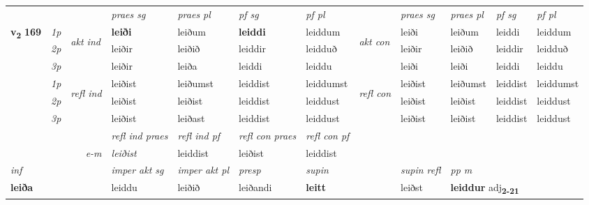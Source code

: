 \begin{longtable}[l]{X>{\footnotesize\itshape}llXXXXlXXXX}
\midrule

 & &   & \textit{praes sg}  & \textit{praes pl}    & \textit{ pf sg} & \textit{pf pl} & & \textit{praes sg}  & \textit{praes pl}    & \textit{pf sg} & \textit{pf pl }  \\ \cmidrule{4-7} \cmidrule{9-12}
 \multirow{2}{*}{{{\textbf{v{\textsubscript{2}}} \Large{\textbf{169}}}}}  & 1p & \multirow{3}{*}{\begin{turn}{90}\textit{akt ind}\end{turn}} & \textbf{leiði} & leiðum & \textbf{leiddi} & leiddum & \multirow{3}{*}{\begin{turn}{90}\textit{akt con}\end{turn}} &leiði & leiðum & leiddi & leiddum\\*
 & 2p &  &  leiðir  & leiðið & leiddir & leidduð & & leiðir & leiðið & leiddir & leidduð \\*
 & 3p &  & leiðir & leiða & leiddi & leiddu & & leiði & leiði& leiddi & leiddu \\*
\cmidrule{4-7} \cmidrule{9-12}
 & 1p & \multirow{3}{*}{\begin{turn}{90}\textit{refl ind}\end{turn}}  & leiðist & leiðumst & leiddist & leiddumst & \multirow{3}{*}{\begin{turn}{90}\textit{refl con}\end{turn}}  &leiðist & leiðumst & leiddist & leiddumst \\*
 & 2p &  & leiðist & leiðist & leiddist & leiddust & &leiðist & leiðist & leiddist & leiddust \\*
 & 3p  & & leiðist & leiðast & leiddist & leiddust & & leiðist & leiðist& leiddist & leiddust \\*
\cmidrule{4-7} \cmidrule{9-12}

 & && \textit{refl ind praes} & \textit{refl ind pf} & \textit{refl con praes} & \textit{refl con pf} \\*
\multicolumn{3}{r}{\textit{e-m}}& leiðist & leiddist & leiðist & leiddist \\*

\cmidrule{4-7}
   {\textit{inf}} & &  & \textit{imper akt sg} & \textit{imper akt pl}   & \textit{presp} & \textit{supin} && \textit{supin refl} & \textit{pp m} \\*
  {\textbf{leiða}} & && leiddu  & leiðið   & leiðandi &  \textbf{leitt} && leiðst & \multicolumn{2}{l}{\textbf{leiddur} adj\textbf{\textsubscript{2-21}}} \\*

\midrule


\end{longtable}
